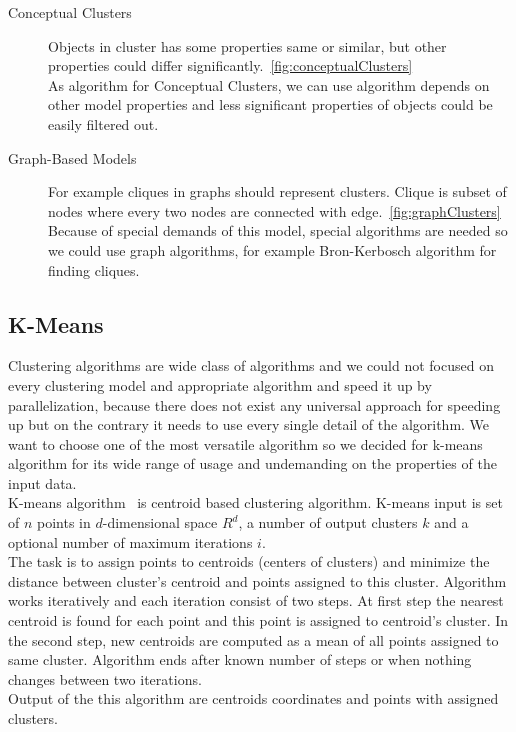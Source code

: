 \begin{description}
\item[Conceptual Clusters] Objects in cluster has some properties same or similar, but other properties could differ significantly.~\autoref{fig:conceptualClusters}\\
As algorithm for Conceptual Clusters, we can use algorithm depends on other model properties and less significant properties of objects could be easily filtered out.

\item[Graph-Based Models] For example cliques in graphs should represent clusters. Clique is subset of nodes where every two nodes are connected with edge.~\autoref{fig:graphClusters}\\
Because of special demands of this model, special algorithms are needed so we could use graph algorithms, for example Bron-Kerbosch algorithm for finding cliques. %
\end{description}

\subsection{K-Means} 
Clustering algorithms are wide class of algorithms and we could not focused on every clustering model and appropriate algorithm and speed it up by parallelization, because there does not exist any universal approach for speeding up but on the contrary it needs to use every single detail of the algorithm. We want to choose one of the most versatile algorithm so we decided for k-means algorithm for its wide range of usage and undemanding on the properties of the input data.\\
K-means algorithm~\cite{hartigan1979algorithm,Tan05} is centroid based clustering algorithm. K-means input is set of $n$ points in $d$-dimensional space $R^d$, a number of output clusters $k$ and a optional number of maximum iterations $i$. \\
The task is to assign points to centroids (centers of clusters) and minimize the distance between cluster's centroid and points assigned to this cluster. Algorithm works iteratively and each iteration consist of two steps. At first step the nearest centroid is found for each point and this point is assigned to centroid's cluster. In the second step, new centroids are computed as a mean of all points assigned to same cluster. Algorithm ends after known number of steps or when nothing changes between two iterations.\\
Output of the this algorithm are centroids coordinates and points with assigned clusters.


